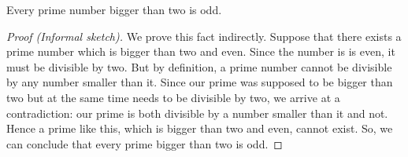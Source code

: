 \begin{enumerate}
		\begin{proposition}
		Every prime number bigger than two is odd.
		\end{proposition}
		\begin{proof}[Proof (Informal sketch)]
			We prove this fact indirectly. Suppose that there exists a prime number
			which is bigger than two and even. Since the number is is even, it must be
			divisible by two. But by definition, a prime number cannot be divisible by
			any number smaller than it. Since our prime was supposed to be bigger than
			two but at the same time needs to be divisible by two, we arrive at a
			contradiction: our prime is both divisible by a number smaller than it and
			not. Hence a prime like this, which is bigger than two and even, cannot
			exist. So, we can conclude that every prime bigger than two is odd.
		\end{proof}

	\end{enumerate}
	
